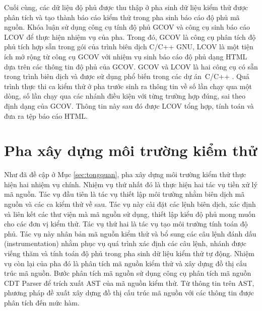 Cuối cùng, các dữ liệu độ phủ được thu thập ở pha sinh dữ liệu kiểm thử được phân tích và tạo thành báo cáo kiểm thử trong pha sinh báo cáo độ phủ mã nguồn. Khóa luận sử dụng công cụ tính độ phủ GCOV và công cụ sinh báo cáo LCOV để thực hiện nhiệm vụ của pha. Trong đó, GCOV là công cụ phân tích độ phủ tích hợp sẵn trong gói của trình biên dịch C/C++ GNU, LCOV là một tiện ích mở rộng từ công cụ GCOV với nhiệm vụ sinh báo cáo độ phủ dạng HTML dựa trên các thông tin độ phủ của GCOV. GCOV và LCOV là hai công cụ có sẵn trong trình biên dịch và được sử dụng phổ biến trong các dự án~C/C++ \cite{hu2021software}. Quá trình thực thi ca kiểm thử ở pha trước sinh ra thông tin về số lần chạy qua một dòng, số lần chạy qua các nhánh điều kiện với từng trường hợp đúng, sai theo định dạng của GCOV. Thông tin này sau đó được LCOV tổng hợp, tính toán và đưa ra tệp báo cáo HTML.

\section{Pha xây dựng môi trường kiểm thử} \label{sec:3-build-env}
Như đã đề cập ở Mục \ref{sec:tongquan}, pha xây dựng môi trường kiểm thử thực hiện hai nhiệm vụ chính. Nhiệm vụ thứ nhất đó là thực hiện hai tác vụ tiền xử lý mã nguồn. Tác vụ đầu tiên là tác vụ thiết lập môi trường nhằm biên dịch mã nguồn và các ca kiểm thử về sau. Tác vụ này cài đặt các lệnh biên dịch, xác định và liên kết các thư viện mà mã nguồn sử dụng, thiết lập kiểu độ phủ mong muốn cho các đơn vị kiểm thử. Tác vụ thứ hai là tác vụ tạo môi trường tính toán độ phủ. Tác vụ này nhân bản mã nguồn kiểm thử và bổ sung các câu lệnh đánh dấu (instrumentation) nhằm phục vụ quá trình xác định các câu lệnh, nhánh được viếng thăm và tính toán độ phủ trong pha sinh dữ liệu kiểm thử tự động. Nhiệm vụ còn lại của pha đó là phân tích mã nguồn kiểm thử và xây dựng đồ thị cấu trúc mã nguồn. Bước phân tích mã nguồn sử dụng công cụ phân tích mã nguồn CDT Parser để trích xuất AST của mã nguồn kiểm thử. Từ thông tin trên AST, phương pháp đề xuất xây dựng đồ thị cấu trúc mã nguồn với các thông tin được phân tích đến mức hàm.

